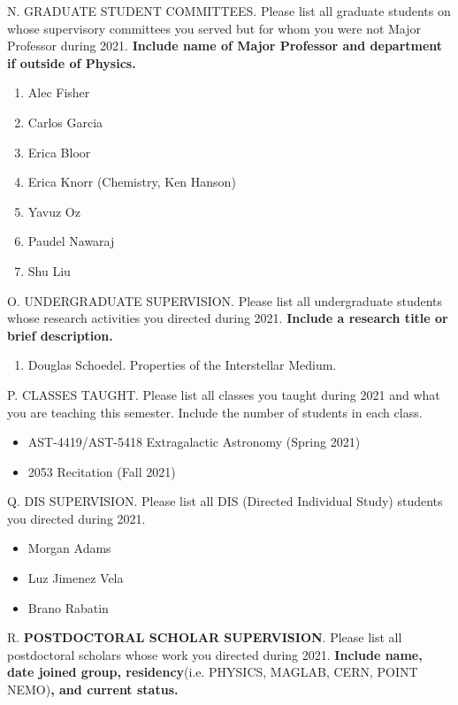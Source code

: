 \noindent N. GRADUATE STUDENT COMMITTEES. Please list all graduate
students on whose supervisory committees you served but for whom you
were not Major Professor during 2021. {\bf Include name of Major Professor 
and department if outside of Physics. }
\bigskip

\begin{enumerate}
    \item Alec Fisher
    \item Carlos Garcia 
    \item Erica Bloor
    \item Erica Knorr (Chemistry, Ken Hanson)
    \item Yavuz Oz
    \item Paudel Nawaraj
    \item Shu Liu
\end{enumerate}

\noindent O. UNDERGRADUATE SUPERVISION. Please list all
undergraduate students whose research activities you directed during
2021.  {\bf Include a research title or brief description. }
\bigskip

\begin{enumerate}
    \item Douglas Schoedel.  Properties of the Interstellar Medium.
\end{enumerate}

\noindent P. CLASSES TAUGHT. Please list all classes you taught
during 2021 and what you are teaching this semester.  Include the
number of students in each class.
\bigskip


\begin{itemize}
	\item AST-4419/AST-5418 Extragalactic Astronomy (Spring 2021)
	\item 2053 Recitation (Fall 2021)
\end{itemize}

\noindent Q. DIS SUPERVISION. Please list all DIS (Directed
Individual Study) students you directed during 2021.
\bigskip

\begin{itemize}
    \item Morgan Adams
    \item Luz Jimenez Vela
    \item Brano Rabatin
\end{itemize}

\noindent R. {\bf POSTDOCTORAL SCHOLAR SUPERVISION}. Please list all postdoctoral scholars whose work you directed during 2021.  {\bf Include name, date joined group, residency}(i.e. PHYSICS, MAGLAB, CERN, POINT NEMO){\bf, and current status. }
\bigskip

